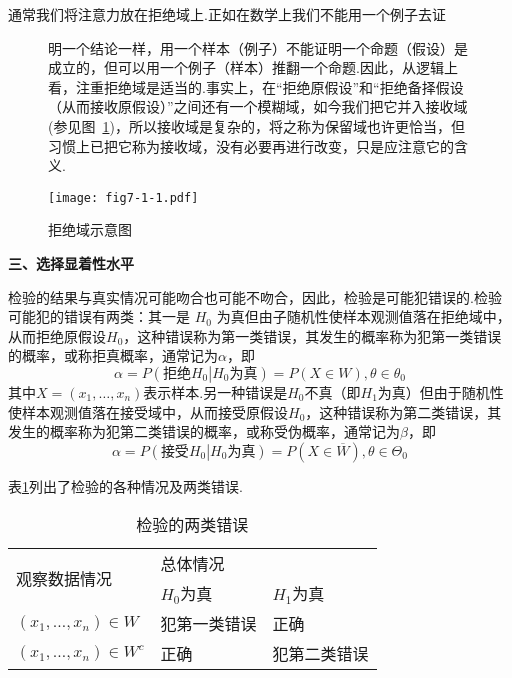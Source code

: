 通常我们将注意力放在拒绝域上.正如在数学上我们不能用一个例子去证
\begin{figure}[!htbp]
\begin{minipage}[t]{0.60\linewidth}	
明一个结论一样，用一个样本（例子）不能证明一个命题（假设）是成立的，但可以用一个例子（样本）推翻一个命题.因此，从逻辑上看，注重拒绝域是适当的.事实上，在“拒绝原假设”和“拒绝备择假设（从而接收原假设）”之间还有一个模糊域，如今我们把它并入接收域(参见图~\ref{fig7.1.1})，所以接收域是复杂的，将之称为保留域也许更恰当，但习惯上已把它称为接收域，没有必要再进行改变，只是应注意它的含义.
\end{minipage}
\begin{minipage}[t]{0.40\linewidth} 
	\vspace{-4pt}
	\begin{flushright}
		{\texttt{[image: fig7-1-1.pdf]}}%
		\caption{拒绝域示意图}\label{fig7.1.1}
	\end{flushright}
\end{minipage} 	
\end{figure}

\textbf{三、选择显着性水平}

检验的结果与真实情况可能吻合也可能不吻合，因此，检验是可能犯错误的.检验可能犯的错误有两类：其一是 $H_{0}$ 为真但由子随机性使样本观测值落在拒绝域中，从而拒绝原假设$H_{0}$，这种错误称为第一类错误，其发生的概率称为犯第一类错误的概率，或称拒真概率，通常记为$\alpha$，即
\begin{equation}\label{eq7.1.1}
\alpha =P\left(\textrm{拒绝}H_0\left| H_0\textrm{为真}\right.\right)=P\left(X\in W\right),\theta\in\theta_0
\end{equation}
其中$X= \left( x _ { 1 } , \dotsc , x _ { n } \right)$表示样本.另一种错误是$H_{0}$不真（即$H_{1}$为真）但由于随机性使样本观测值落在接受域中，从而接受原假设$H_{0}$，这种错误称为第二类错误，其发生的概率称为犯第二类错误的概率，或称受伪概率，通常记为$\beta$，即
\begin{equation}\label{eq7.1.2}
\alpha =P\left(\textrm{接受}H_0\left| H_0\textrm{为真}\right.\right)=P\left(X\in \overline{ W }\right),\theta\in\Theta_0
\end{equation}

表\ref{table7.1.1}列出了检验的各种情况及两类错误.
\begin{table}[!htp]
	\centering
	\caption{检验的两类错误}\label{table7.1.1}
		\begin{tabular}{lll}
	\hline
\multirow{2}{*}{观察数据情况} & \multicolumn{2}{l}{\hspace{4em}总体情况} \\ \cline{2-3} 
& $H_{0}$为真   & $H_{1}$为真     \\ \hline
$(x_{1},\dotsc,x_{n})\in W$ & 犯第一类错误 & 正确  \\ 
$(x_{1},\dotsc,x_{n})\in W^{c}$   & 正确  & 犯第二类错误        \\ \hline
	\end{tabular}
\end{table}

